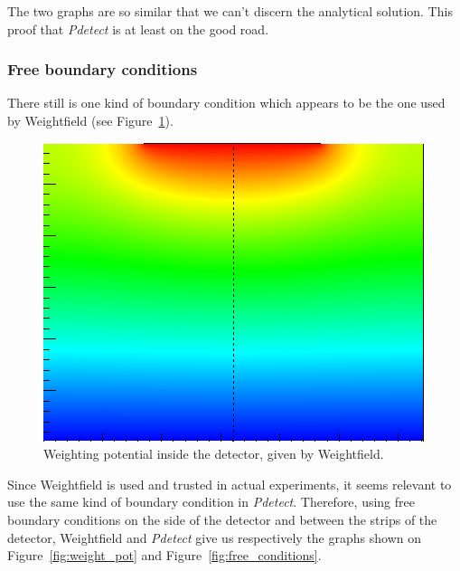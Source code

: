 \documentclass[11pt]{article}
\begin{document}
			The two graphs are so similar that we can't discern the analytical solution. This proof that
			\textit{Pdetect} is at least on the good road.

		\subsubsection{Free boundary conditions}

			There still is one kind of boundary condition which appears to be the one used by Weightfield
			(see Figure~\ref{fig:weight_free}).

			\begin{figure}[H]
				\center
				\includegraphics[scale=0.45]{images/boundary_conditions/detector/weight_free.png}
				\caption{Weighting potential inside the detector, given by Weightfield.}
				\label{fig:weight_free}
			\end{figure}

			Since Weightfield is used and trusted in actual experiments, it seems relevant to use the same kind
			of boundary condition in \textit{Pdetect}. Therefore, using free boundary conditions on the side of
			the detector and between the strips of the detector, Weightfield and \textit{Pdetect} give us respectively
			the graphs shown on Figure~\ref{fig:weight_pot} and Figure~\ref{fig:free_conditions}.
\end{document}

